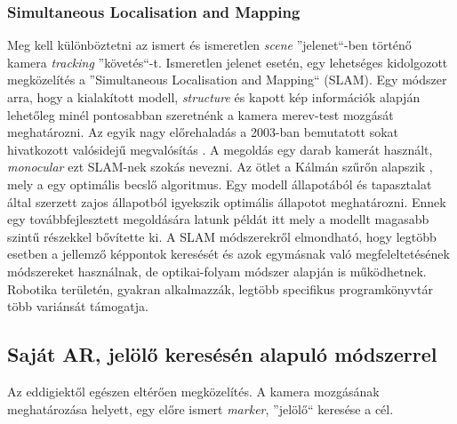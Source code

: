 \documentclass[12pt,a4paper,oneside]{report} %
\begin{document}
\subsubsection{Simultaneous Localisation and Mapping}
Meg kell különböztetni az ismert és ismeretlen \textit{scene} ''jelenet``-ben történő kamera \textit{tracking} ''követés``-t. Ismeretlen jelenet esetén, egy lehetséges kidolgozott megközelítés a ''Simultaneous Localisation and Mapping`` (SLAM). Egy módszer arra, hogy a kialakított modell, \textit{structure} és kapott kép információk alapján lehetőleg minél pontosabban szeretnénk a kamera merev-test mozgását meghatározni.
Az egyik nagy előrehaladás a 2003-ban bemutatott sokat hivatkozott valósidejű megvalósítás \cite{davison2003real}. A megoldás egy darab kamerát használt, \textit{monocular} ezt SLAM-nek szokás nevezni. 
Az ötlet a Kálmán szűrőn alapszik \cite{welch1995introduction}, mely a egy optimális becslő algoritmus. Egy modell állapotából és tapasztalat által szerzett zajos állapotból igyekszik optimális állapotot meghatározni. Ennek egy továbbfejlesztett megoldására latunk példát itt \cite{klein2008improving} mely a modellt magasabb szintű részekkel bővítette ki. A SLAM módszerekről elmondható, hogy legtöbb esetben a jellemző képpontok keresését és azok egymásnak való megfeleltetésének módszereket használnak, de optikai-folyam módszer alapján is működhetnek. 
Robotika területén, gyakran alkalmazzák, legtöbb specifikus programkönyvtár több variánsát támogatja.

\subsection{Saját AR, jelölő keresésén alapuló módszerrel}
Az eddigiektől egészen eltérően megközelítés. A kamera mozgásának meghatározása helyett, egy előre ismert \textit{marker}, ''jelölő``  keresése a cél. 
\end{document}
